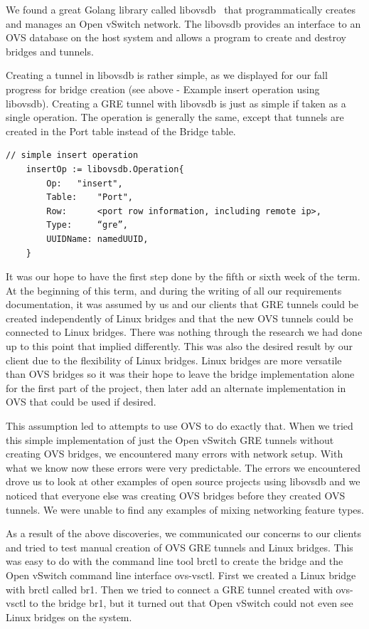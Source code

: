 \documentclass[10pt,onecolumn,journal,draftclsnofoot]{IEEEtran}
\begin{document}
We found a great Golang library called libovsdb~\cite{libovsdb} that
programmatically creates and manages an Open vSwitch network. The libovsdb
provides an interface to an OVS database on the host system and allows a
program to create and destroy bridges and tunnels.

Creating a tunnel in libovsdb is rather simple, as we displayed for our fall
progress for bridge creation (see above - Example insert operation using
libovsdb). Creating a GRE tunnel with libovsdb is just as simple if taken as a
single operation. The operation is generally the same, except that tunnels are
created in the Port table instead of the Bridge table.

\begin{lstlisting}[caption=Example tunnel insert operation using libovsdb]
	// simple insert operation
	insertOp := libovsdb.Operation{
		Op:	  "insert",
		Table:	  "Port",
		Row:	  <port row information, including remote ip>,
		Type:     “gre”,
		UUIDName: namedUUID,
	}
\end{lstlisting}

It was our hope to have the first step done by the fifth or sixth week of the
term. At the beginning of this term, and during the writing of all our
requirements documentation, it was assumed by us and our clients that GRE
tunnels could be created independently of Linux bridges and that the new OVS
tunnels could be connected to Linux bridges. There was nothing through the
research we had done up to this point that implied differently. This was also
the desired result by our client due to the flexibility of Linux bridges. Linux
bridges are more versatile than OVS bridges so it was their hope to leave the
bridge implementation alone for the first part of the project, then later add
an alternate implementation in OVS that could be used if desired.

This assumption led to attempts to use OVS to do exactly that. When we tried
this simple implementation of just the Open vSwitch GRE tunnels without
creating OVS bridges, we encountered many errors with network setup. With what
we know now these errors were very predictable. The errors we encountered drove
us to look at other examples of open source projects using libovsdb and we
noticed that everyone else was creating OVS bridges before they created OVS
tunnels. We were unable to find any examples of mixing networking feature
types.

As a result of the above discoveries, we communicated our concerns to our
clients and tried to test manual creation of OVS GRE tunnels and Linux bridges.
This was easy to do with the command line tool brctl to create the bridge and
the Open vSwitch command line interface ovs-vsctl. First we created a Linux
bridge with brctl called br1. Then we tried to connect a GRE tunnel created
with ovs-vsctl to the bridge br1, but it turned out that Open vSwitch could not
even see Linux bridges on the system.
\end{document}
